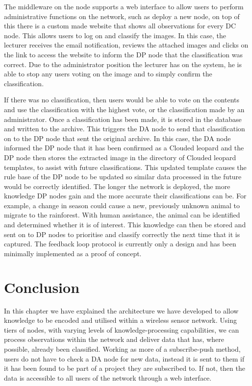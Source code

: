 			The middleware on the node supports a web interface to allow users to perform administrative functions on the network, such as deploy a new node, on top of this there is a custom made website that shows all observations for every DC node. This allows users to log on and classify the images. In this case, the lecturer receives the email notification, reviews the attached images and clicks on the link to access the website to inform the DP node that the classification was correct. Due to the administrator position the lecturer has on the system, he is able to stop any users voting on the image and to simply confirm the classification.
			
			If there was no classification, then users would be able to vote on the contents and use the classification with the highest vote, or the classification made by an administrator. Once a classification has been made, it is stored in the database and written to the archive. This triggers the DA node to send that classification on to the DP node that sent the original archive. In this case, the DA node informed the DP node that it has been confirmed as a Clouded leopard and the DP node then stores the extracted image in the directory of Clouded leopard templates, to assist with future classifications. This updated template causes the rule base of the DP node to be updated so similar data processed in the future would be correctly identified. The longer the network is deployed, the more knowledge DP nodes gain and the more accurate their classifications can be. For example, a change in season could cause a new, previously unknown animal to migrate to the rainforest. With human assistance, the animal can be identified and determined whether it is of interest. This knowledge can then be stored and sent on to DP nodes to prioritise and classify correctly the next time that it is captured. The feedback loop protocol is currently only a design and has been minimally implemented as a proof of concept.
					
	\section{Conclusion}\label{arch:conc}
		In this chapter we have explained the architecture we have developed to allow knowledge to be encoded and utilised within a wireless sensor network. Using tiers of nodes, with varying levels of knowledge-processing capabilities, we can process observations within the network and deliver data that has, where possible, already been classified. Working as more of a subscribe-push method, users do not have to check a DA node for new data, instead it is sent to them if it has been found to be part of a project they are subscribed to. If not, then the data is accessible to all users of the network through a web interface.
		
